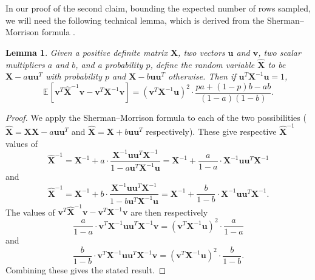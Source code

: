 \documentclass[11pt]{article}
\numberwithin{equation}{section}
\newtheorem{lemma}[theorem]{Lemma}
\theoremstyle{definition}
\theoremstyle{plain}
\newcommand{\bv}[1]{\mathbf{#1}}
\newcommand{\expct}[3]{\mathbb{E}_{{#1}_{#2}}\left[#3\right]}
\begin{document}
In our proof of the second claim, bounding the expected number of rows sampled, we will need the following technical lemma, which is derived from the
Sherman--Morrison formula \cite{sherman1949adjustment}.
%
\begin{lemma}
\label{lem:rankoneupdate}
Given a positive definite matrix $\bv{X}$, two vectors $\bv{u}$ and $\bv{v}$, two scalar multipliers $a$ and $b$, and a probability $p$, define the random variable $\bv{\widehat X}$ to be $\bv X - a \bv{u} \bv{u}^T$ with probability $p$ and $\bv X - b \bv{u} \bv{u}^T$ otherwise.  Then if $\bv{u}^T \bv{X}^{-1} \bv{u} = 1$,
$$
\expct{}{}{\bv{v}^T \bv{\widehat X}^{-1} \bv{v} - \bv{v}^T \bv{X}^{-1} \bv{v}} = (\bv{v}^T \bv{X}^{-1} \bv{u})^2 \cdot \frac{pa + (1-p)b - ab}{(1-a)(1-b)}.
$$
\end{lemma}
\begin{proof}
We apply the Sherman--Morrison formula to each of the two possibilities ($\bv{\widehat X} = \bv{XX} - a \bv{u} \bv{u}^T$ and $\bv{\widehat X} = \bv{X} + b \bv{u} \bv{u}^T$ respectively).  These give respective ${\bv{\widehat X}}^{-1}$ values of %
$$
{\bv{\widehat X}}^{-1} = \bv{X}^{-1} + a \cdot \frac{\bv{X}^{-1} \bv{u} \bv{u}^T \bv{X}^{-1}}{1 - a \bv{u}^T \bv{X}^{-1} \bv{u}} = \bv{X}^{-1} + \frac{a}{1-a} \cdot  \bv{X}^{-1} \bv{u} \bv{u}^T \bv{X}^{-1}
$$
and
$$
{\bv{\widehat X}}^{-1} = \bv{X}^{-1} + b\cdot \frac{\bv{X}^{-1} \bv{u} \bv{u}^T \bv{X}^{-1}}{1 - b \bv{u}^T \bv{X}^{-1} \bv{u}} = \bv{X}^{-1} + \frac{b}{1-b} \cdot \bv{X}^{-1} \bv{u} \bv{u}^T \bv{X}^{-1}.
$$
The values of $\bv{v}^T \bv{\widehat  X}^{-1} \bv{v} - \bv{v}^T \bv{X}^{-1} \bv{v}$ are then respectively
$$
\frac{a}{1-a} \cdot \bv{v}^T \bv{X}^{-1} \bv{u} \bv{u}^T \bv{X}^{-1} \bv{v} = (\bv{v}^T \bv{X}^{-1} \bv{u})^2 \cdot \frac{a}{1-a}
$$
and
$$
\frac{b}{1-b} \cdot \bv{v}^T \bv{X}^{-1} \bv{u} \bv{u}^T \bv{X}^{-1} \bv{v} = (\bv{v}^T \bv{X}^{-1} \bv{u})^2\cdot  \frac{b}{1-b}.
$$
Combining these gives the stated result.
\end{proof}
\end{document}
